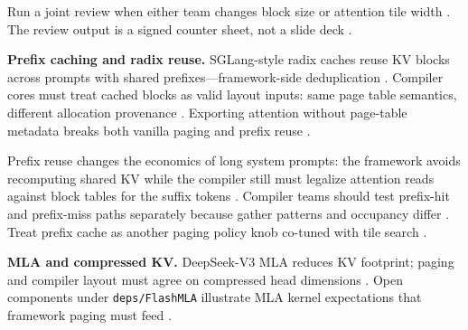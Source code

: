 Run a joint review when either team changes block size or attention tile width \citep{kwon2023vllm,dao2022flashattention,dao2023flashdecoding,patel2025llminference,memoryfloor2026,yirage2026,chen2020compilerbasedhardw,taxbreak2026,dlbook,liu2024deepseekv3,semianalysis2024tma,amd2024xdna,amd2024aie,nvidia2022hopper,nvidia2024cudagraphs,dlbook}. The review output is a signed counter sheet, not a slide deck \citep{taxbreak2026,memoryfloor2026,patel2025llminference,yirage2026,chen2020compilerbasedhardw,kwon2023vllm,dlbook}.

\textbf{Prefix caching and radix reuse.} SGLang-style radix caches reuse KV blocks across prompts with shared prefixes---framework-side deduplication \citep{patel2025llminference,kwon2023vllm,dlbook}. Compiler cores must treat cached blocks as valid layout inputs: same page table semantics, different allocation provenance \citep{yirage2026,chen2020compilerbasedhardw,kwon2023vllm,patel2025llminference}. Exporting attention without page-table metadata breaks both vanilla paging and prefix reuse \citep{dao2022flashattention,dao2023flashdecoding,yirage2026,memoryfloor2026}.

Prefix reuse changes the economics of long system prompts: the framework avoids recomputing shared KV while the compiler still must legalize attention reads against block tables for the suffix tokens \citep{patel2025llminference,kwon2023vllm,yirage2026,chen2020compilerbasedhardw,dao2022flashattention,dao2023flashdecoding,memoryfloor2026,taxbreak2026,dlbook,liu2024deepseekv3,semianalysis2024tma,nvidia2024cudagraphs,amd2024xdna,amd2024aie,nvidia2022hopper,dlbook}. Compiler teams should test prefix-hit and prefix-miss paths separately because gather patterns and occupancy differ \citep{yirage2026,chen2020compilerbasedhardw,kwon2023vllm,patel2025llminference,dao2022flashattention,memoryfloor2026,taxbreak2026,dlbook}. Treat prefix cache as another paging policy knob co-tuned with tile search \citep{patel2025llminference,kwon2023vllm,yirage2026,chen2020compilerbasedhardw,memoryfloor2026,taxbreak2026,dao2022flashattention,dlbook}.

\textbf{MLA and compressed KV.} DeepSeek-V3 MLA reduces KV footprint; paging and compiler layout must agree on compressed head dimensions \citep{liu2024deepseekv3,patel2025llminference,kwon2023vllm,yirage2026,chen2020compilerbasedhardw,taxbreak2026,memoryfloor2026}. Open components under \texttt{deps/FlashMLA} illustrate MLA kernel expectations that framework paging must feed \citep{liu2024deepseekv3,yirage2026,chen2020compilerbasedhardw,patel2025llminference}.

